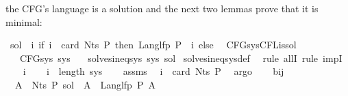 \begin{isabellebody}
\begin{isamarkuptext}
the CFG's language is a solution and the next two lemmas prove that it is minimal:%
\end{isamarkuptext}\isamarkuptrue%
\isamarkupfalse%
\ {\isachardoublequoteopen}sol\ {\isasymequiv}\ {\isasymlambda}i{\isachardot}{\kern0pt}\ if\ i\ {\isacharless}{\kern0pt}\ card\ {\isacharparenleft}{\kern0pt}Nts\ P{\isacharparenright}{\kern0pt}\ then\ Lang{\isacharunderscore}{\kern0pt}lfp\ P\ {\isacharparenleft}{\kern0pt}{\isasymgamma}\ i{\isacharparenright}{\kern0pt}\ else\ {\isacharbraceleft}{\kern0pt}{\isacharbraceright}{\kern0pt}{\isachardoublequoteclose}\isanewline
\isanewline
{}\isamarkupfalse%
\ CFG{\isacharunderscore}{\kern0pt}sys{\isacharunderscore}{\kern0pt}CFL{\isacharunderscore}{\kern0pt}is{\isacharunderscore}{\kern0pt}sol{\isacharcolon}{\kern0pt}\isanewline
\ \ \ {\isachardoublequoteopen}CFG{\isacharunderscore}{\kern0pt}sys\ sys{\isachardoublequoteclose}\isanewline
\ \ \ {\isachardoublequoteopen}solves{\isacharunderscore}{\kern0pt}ineq{\isacharunderscore}{\kern0pt}sys\ sys\ sol{\isachardoublequoteclose}\isanewline
%
\isadelimproof
%
\endisadelimproof
%
\isatagproof
{}\isamarkupfalse%
\ solves{\isacharunderscore}{\kern0pt}ineq{\isacharunderscore}{\kern0pt}sys{\isacharunderscore}{\kern0pt}def\ \isamarkupfalse%
\ {\isacharparenleft}{\kern0pt}rule\ allI{\isacharcomma}{\kern0pt}\ rule\ impI{\isacharparenright}{\kern0pt}\isanewline
\ \ \isamarkupfalse%
\ i\isanewline
\ \ \isamarkupfalse%
\ {\isachardoublequoteopen}i\ {\isacharless}{\kern0pt}\ length\ sys{\isachardoublequoteclose}\isanewline
\ \ \isamarkupfalse%
\ assms\ \isamarkupfalse%
\ {\isachardoublequoteopen}i\ {\isacharless}{\kern0pt}\ card\ {\isacharparenleft}{\kern0pt}Nts\ P{\isacharparenright}{\kern0pt}{\isachardoublequoteclose}\ \isamarkupfalse%
\ argo\isanewline
\ \ \isamarkupfalse%
\ bij{\isacharunderscore}{\kern0pt}{\isasymgamma}{\isacharunderscore}{\kern0pt}{\isasymgamma}{\isacharprime}{\kern0pt}\ \isamarkupfalse%
\ {\isacharasterisk}{\kern0pt}{\isacharcolon}{\kern0pt}\ {\isachardoublequoteopen}{\isasymforall}A\ {\isasymin}\ Nts\ P{\isachardot}{\kern0pt}\ sol\ {\isacharparenleft}{\kern0pt}{\isasymgamma}{\isacharprime}{\kern0pt}\ A{\isacharparenright}{\kern0pt}\ {\isacharequal}{\kern0pt}\ Lang{\isacharunderscore}{\kern0pt}lfp\ P\ A{\isachardoublequoteclose}\isanewline
\ \ \ \ \isamarkupfalse%

\end{isabellebody}

